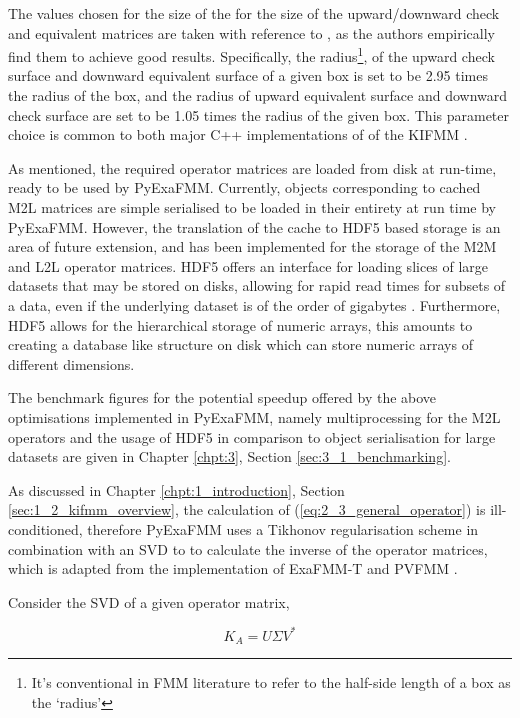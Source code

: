 The values chosen for the size of the for the size of the upward/downward
check and equivalent matrices are taken with reference to \cite{Malhotra:2015:CCP},
as the authors empirically find them to achieve good results. Specifically,
the radius\footnote{It's conventional in FMM literature to refer to the half-side
length of a box as the `radius'}, of the upward check surface and downward equivalent
surface of a given box is set to be 2.95 times the radius of the box, and the radius of
upward equivalent surface and downward check surface are set to be 1.05 times the radius
of the given box. This parameter choice is common to both major C++ implementations of
of the \gls{KIFMM} \cite{exafmm,Malhotra:2015:CCP}.

As mentioned, the required operator matrices are loaded from disk at run-time, ready to
be used by \gls{PyExaFMM}. Currently, objects corresponding to cached \gls{M2L}
matrices are simple serialised to be loaded in their entirety at run time by
\gls{PyExaFMM}. However, the translation of the cache to HDF5 based storage is
an area of future extension, and has been implemented
for the storage of the \gls{M2M} and \gls{L2L} operator matrices. HDF5 offers an
interface for loading slices of large datasets that may be stored on disks, allowing
for rapid read times for subsets of a data, even if the underlying dataset
is of the order of gigabytes \cite{Wasser:NSF}. Furthermore, HDF5 allows for the
hierarchical storage of numeric arrays, this amounts to creating
a database like structure on disk which can store numeric arrays of different
dimensions.

The  benchmark figures for the potential speedup offered by the above optimisations
implemented in \gls{PyExaFMM}, namely multiprocessing for the \gls{M2L} operators
and the usage of HDF5 in comparison to object serialisation for large datasets are given
in Chapter \ref{chpt:3}, Section \ref{sec:3_1_benchmarking}.

As discussed in Chapter \ref{chpt:1_introduction}, Section \ref{sec:1_2_kifmm_overview},
the calculation of (\ref{eq:2_3_general_operator}) is ill-conditioned, therefore
\gls{PyExaFMM} uses a Tikhonov regularisation scheme in combination with an SVD
to to calculate the inverse of the operator matrices, which is adapted from the
implementation of ExaFMM-T and PVFMM \cite{Malhotra:2015:CCP, exafmm}.

Consider the SVD of a given operator matrix,

\begin{equation}
    K_A = U \Sigma V^*
\end{equation}

